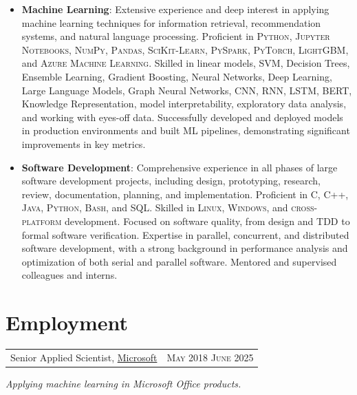 \documentclass{article}
\makeatletter
\newcommand{\whatwherewhen}[3]{
\noindent\begin{tabular*}{\columnwidth}{@{}@{\extracolsep{\fill}}lr@{}}
#1, #2 & \textsc{#3}
\end{tabular*}}
\makeatother
\begin{document}
\begin{itemize}

\item \textbf{Machine Learning}: Extensive experience and deep interest in applying machine learning techniques for information retrieval, recommendation systems, and natural language processing. Proficient in \textsc{Python}, \textsc{Jupyter Notebooks}, \textsc{NumPy}, \textsc{Pandas}, \textsc{SciKit-Learn}, \textsc{PySpark}, \textsc{PyTorch}, \textsc{LightGBM}, and \textsc{Azure Machine Learning}. Skilled in linear models, SVM, Decision Trees, Ensemble Learning, Gradient Boosting, Neural Networks, Deep Learning, Large Language Models, Graph Neural Networks, CNN, RNN, LSTM, BERT, Knowledge Representation, model interpretability, exploratory data analysis, and working with eyes-off data. Successfully developed and deployed models in production environments and built ML pipelines, demonstrating significant improvements in key metrics.

\item \textbf{Software Development}: Comprehensive experience in all phases of large software development projects, including design, prototyping, research, review, documentation, planning, and implementation. Proficient in \textsc{C}, \textsc{C++}, \textsc{Java}, \textsc{Python}, \textsc{Bash}, and \textsc{SQL}. Skilled in \textsc{Linux}, \textsc{Windows}, and \textsc{cross-platform} development. Focused on software quality, from design and TDD to formal software verification. Expertise in parallel, concurrent, and distributed software development, with a strong background in performance analysis and optimization of both serial and parallel software. Mentored and supervised colleagues and interns.

\end{itemize}


\section{Employment}

\whatwherewhen{Senior Applied Scientist}{\href{https://www.microsoft.com/}{Microsoft}}{May 2018 \textendash{} June 2025}

\textit{Applying machine learning in Microsoft Office products.}
\end{document}
